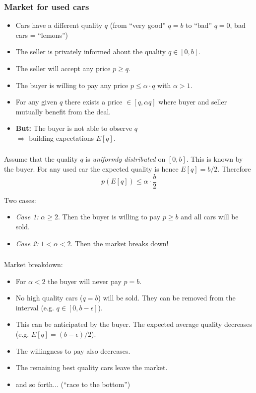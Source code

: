 \documentclass[11pt]{beamer}
\begin{document}
\begin{frame}
\frametitle{Market for used cars}
\begin{itemize}
\item Cars have a different quality $q$ (from ``very good'' $q=b$ to ``bad'' $q=0$, bad cars = ``lemons'')
\item The seller is privately informed about the quality $q\in[0,b]$.
\item The seller will accept any price $p\geq q$.
\item The buyer is willing to pay any price $p\leq \alpha\cdot q$ with $\alpha>1$.
\item For any given $q$ there exists a price $\in[q,\alpha q]$ where buyer and seller mutually benefit from the deal.
\par\medskip

\item \textbf{But:} The buyer is not able to observe $q$\\ $\Rightarrow$ building expectations $E[q]$.
\end{itemize}

\end{frame}


\begin{frame}
\frametitle{\insertsection}

Assume that the quality $q$ is \textit{uniformly distributed} on $[0,b]$. This is known by the buyer.
For any used car the expected quality is hence $E[q]=b/2$. Therefore
$$
p(E[q])\leq \alpha\cdot\frac{b}{2}
$$

Two cases:
\begin{itemize}
\item \textit{Case 1:} $\alpha \geq 2$. Then the buyer is willing to pay $p\geq b$ and all cars will be sold.
\item \textit{Case 2:} $1<\alpha<2$. Then the market breaks down!
\end{itemize}

\end{frame}


\begin{frame}
\frametitle{\insertsection}

Market breakdown:
{\small
\begin{itemize}
\item For $\alpha<2$ the buyer will never pay $p=b$.
\item No high quality cars ($q=b$) will be sold. They can be removed from the interval (e.g. $q\in[0,b-\epsilon]$).
\item This can be anticipated by the buyer. The expected average quality decreases (e.g. $E[q]=(b-\epsilon)/2$).
\item The willingness to pay also decreases.
\item The remaining best quality cars leave the market.
\item and so forth... (``race to the bottom'')
\end{itemize} }
\end{frame}
\end{document}
